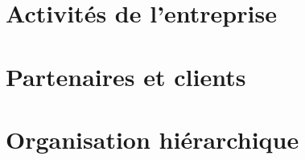 \section{Activités de l'entreprise}
	
	
\section{Partenaires et clients}
	
	
\section{Organisation hiérarchique}
	